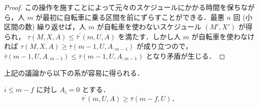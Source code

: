 \begin{proof}
この操作を施すことによって元々のスケジュールにかかる時間を保ちながら，人 $m$ が最初に自転車に乗る区間を前にずらすことができる．最悪 $n$ 回 (小区間の数) 繰り返せば，人 $m$ が自転車を使わないスケジュール $(M\prime, X\prime)$ が得られ， $\tau(M, X, A) \leq \bar\tau^{\prime}(m, U, A)$ を満たす．しかし人 $m$ が自転車を使わなければ $\tau(M, X, A) \geq \bar\tau(m - 1, U, A_{:m-1})$ が成り立つので， $\bar\tau(m - 1, U, A_{:m-1}) \leq \bar\tau(m - 1, U,A_{:m-1})$ となり矛盾が生じる．
\end{proof}
上記の議論から以下の系が容易に得られる．
\begin{corollary}
  $i \leq m - f$ に対し $A_i = 0$ とする．
  \begin{equation}
    \bar\tau^{\prime}(m, U, A) \geq \bar\tau(m - f, U)．
  \end{equation}
\end{corollary}
